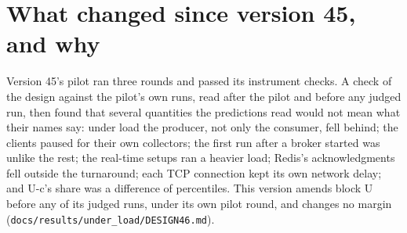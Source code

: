 \documentclass[11pt]{article}
\begin{document}
\section*{What changed since version 45, and why}
Version 45's pilot ran three rounds and passed its instrument checks. A check of the design against
the pilot's own runs, read after the pilot and before any judged run, then found that several
quantities the predictions read would not mean what their names say: under load the producer, not
only the consumer, fell behind; the clients paused for their own collectors; the first run after a
broker started was unlike the rest; the real-time setups ran a heavier load; Redis's acknowledgments
fell outside the turnaround; each TCP connection kept its own network delay; and U-c's share was a
difference of percentiles. This version amends block U before any of its judged runs, under its own
pilot round, and changes no margin (\texttt{docs/results/under\_load/DESIGN46.md}).
\end{document}
